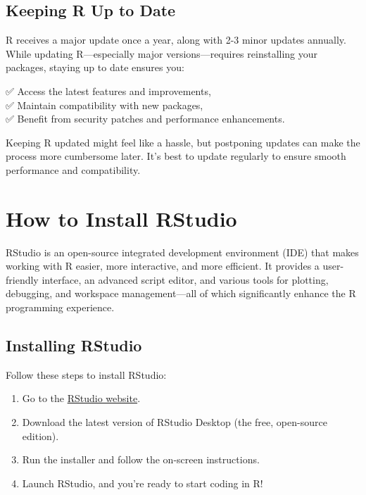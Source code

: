 \documentclass[
]{book}
\providecommand{\tightlist}{%
  \setlength{\itemsep}{0pt}\setlength{\parskip}{0pt}}
\theoremstyle{definition}
\theoremstyle{definition}
\theoremstyle{definition}
\theoremstyle{definition}
\theoremstyle{remark}
\begin{document}
\subsection*{Keeping R Up to Date}\label{keeping-r-up-to-date}

R receives a major update once a year, along with 2-3 minor updates annually. While updating R---especially major versions---requires reinstalling your packages, staying up to date ensures you:

✅ Access the latest features and improvements,\\
✅ Maintain compatibility with new packages,\\
✅ Benefit from security patches and performance enhancements.

Keeping R updated might feel like a hassle, but postponing updates can make the process more cumbersome later. It's best to update regularly to ensure smooth performance and compatibility.

\section{How to Install RStudio}\label{how-to-install-rstudio}

RStudio is an open-source integrated development environment (IDE) that makes working with R easier, more interactive, and more efficient. It provides a user-friendly interface, an advanced script editor, and various tools for plotting, debugging, and workspace management---all of which significantly enhance the R programming experience.

\subsection*{Installing RStudio}\label{installing-rstudio}

Follow these steps to install RStudio:

\begin{enumerate}
\def\labelenumi{\arabic{enumi}.}
\tightlist
\item
  Go to the \href{http://www.rstudio.com/download}{RStudio website}.\\
\item
  Download the latest version of RStudio Desktop (the free, open-source edition).\\
\item
  Run the installer and follow the on-screen instructions.\\
\item
  Launch RStudio, and you're ready to start coding in R!
\end{enumerate}
\end{document}
